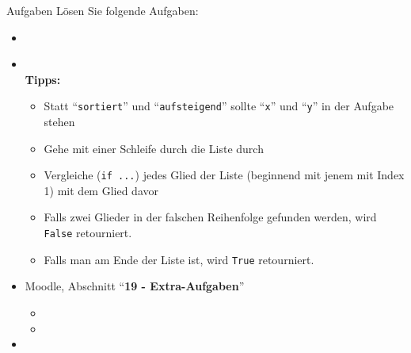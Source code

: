 \begin{frame}{Aufgaben}
	Lösen Sie folgende Aufgaben:
	\begin{itemize}
	    \item {}
	    \item {}\\
	    \textbf{Tipps:}
	    	    \begin{itemize}
	    	    	\item {} Statt ``\texttt{sortiert}'' und ``\texttt{aufsteigend}'' sollte ``\texttt{x}'' und ``\texttt{y}'' in der Aufgabe stehen
	    	    	\item Gehe mit einer Schleife durch die Liste durch
	    	    	\item Vergleiche (\lstinline|if ...|) jedes Glied der Liste (beginnend mit jenem mit Index 1) mit dem Glied davor
	    	    	\item Falls zwei Glieder in der falschen Reihenfolge gefunden werden, wird \lstinline|False| retourniert.
	    	    	\item Falls man am Ende der Liste ist, wird \lstinline|True| retourniert.
	    	    \end{itemize}
	    \item Moodle, Abschnitt ``\textbf{19 -  Extra-Aufgaben}''
	    \begin{itemize}
	    \item {}
	    \item {}
	    \end{itemize}
	    \item {}
	\end{itemize}
\end{frame}